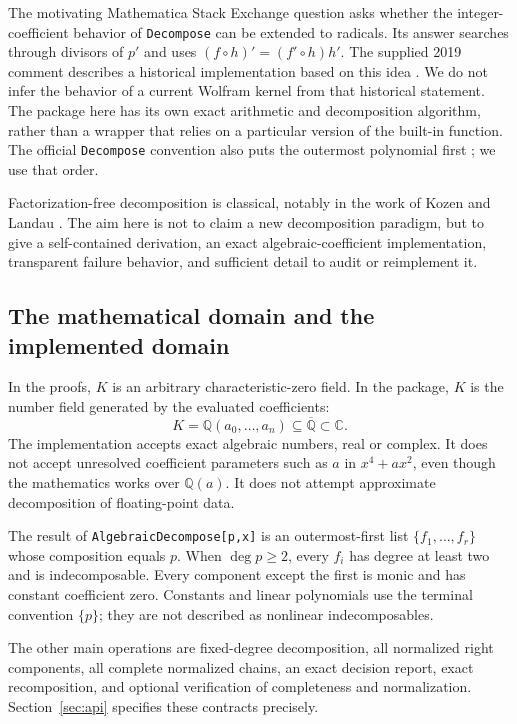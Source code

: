 \documentclass[11pt,letterpaper]{article}
\theoremstyle{definition}
\theoremstyle{remark}
\newcommand{\Q}{\mathbb Q}
\newcommand{\C}{\mathbb C}
\newcommand{\A}{\overline{\mathbb Q}}
\newcommand{\wt}[1]{\texttt{#1}}
\begin{document}
The motivating Mathematica Stack Exchange question asks whether the
integer-coefficient behavior of \wt{Decompose} can be extended to radicals.
Its answer searches through divisors of $p'$ and uses
$(f\circ h)'=(f'\circ h)h'$. The supplied 2019 comment describes a historical
implementation based on this idea \cite{mse}. We do not infer the behavior
of a current Wolfram kernel from that historical statement. The package
here has its own exact arithmetic and decomposition algorithm, rather than
a wrapper that relies on a particular version of the built-in function.
The official \wt{Decompose} convention also puts the outermost polynomial
first \cite{wl-decompose}; we use that order.

Factorization-free decomposition is classical, notably in the work of
Kozen and Landau \cite{kozen-landau}. The aim here is not to claim a new
decomposition paradigm, but to give a self-contained derivation, an exact
algebraic-coefficient implementation, transparent failure behavior, and
sufficient detail to audit or reimplement it.

\subsection{The mathematical domain and the implemented domain}
In the proofs, $K$ is an arbitrary characteristic-zero field. In the
package, $K$ is the number field generated by the evaluated coefficients:
\[
 K=\Q(a_0,\ldots,a_n)\subseteq\A\subset\C.
\]
The implementation accepts exact algebraic numbers, real or complex.
It does not accept unresolved coefficient parameters such as $a$ in
$x^4+a x^2$, even though the mathematics works over $\Q(a)$.
It does not attempt approximate decomposition of floating-point data.

The result of \wt{AlgebraicDecompose[p,x]} is an outermost-first list
$\{f_1,\ldots,f_r\}$ whose composition equals $p$. When $\deg p\geq2$,
every $f_i$ has degree at least two and is indecomposable. Every component
except the first is monic and has constant coefficient zero.
Constants and linear polynomials use the terminal convention $\{p\}$;
they are not described as nonlinear indecomposables.

The other main operations are fixed-degree decomposition, all normalized
right components, all complete normalized chains, an exact decision report,
exact recomposition, and optional verification of completeness and
normalization. Section~\ref{sec:api} specifies these contracts precisely.
\end{document}
